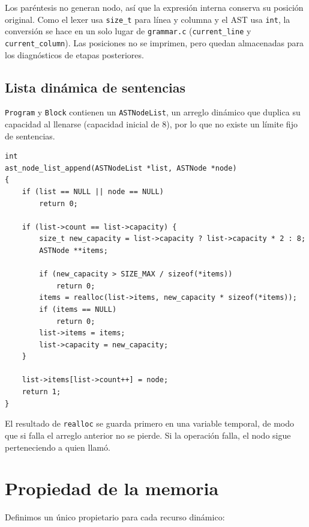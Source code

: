 \documentclass[12pt,letterpaper]{article}
\begin{document}
Los paréntesis no generan nodo, así que la expresión interna conserva su posición original. Como el lexer
usa \texttt{size\_t} para línea y columna y el AST usa \texttt{int}, la conversión se hace en un solo lugar
de \texttt{grammar.c} (\texttt{current\_line} y \texttt{current\_column}). Las posiciones no se imprimen, pero
quedan almacenadas para los diagnósticos de etapas posteriores.

\subsection*{Lista dinámica de sentencias}

\texttt{Program} y \texttt{Block} contienen un \texttt{ASTNodeList}, un arreglo dinámico que duplica su
capacidad al llenarse (capacidad inicial de 8), por lo que no existe un límite fijo de sentencias.

\begin{lstlisting}[style=modernc, caption={\texttt{ast\_node\_list\_append}.}]
int
ast_node_list_append(ASTNodeList *list, ASTNode *node)
{
    if (list == NULL || node == NULL)
        return 0;

    if (list->count == list->capacity) {
        size_t new_capacity = list->capacity ? list->capacity * 2 : 8;
        ASTNode **items;

        if (new_capacity > SIZE_MAX / sizeof(*items))
            return 0;
        items = realloc(list->items, new_capacity * sizeof(*items));
        if (items == NULL)
            return 0;
        list->items = items;
        list->capacity = new_capacity;
    }

    list->items[list->count++] = node;
    return 1;
}
\end{lstlisting}

\bigskip

El resultado de \texttt{realloc} se guarda primero en una variable temporal, de modo que si falla el arreglo
anterior no se pierde. Si la operación falla, el nodo sigue perteneciendo a quien llamó.


\section*{Propiedad de la memoria}

Definimos un único propietario para cada recurso dinámico:
\end{document}
